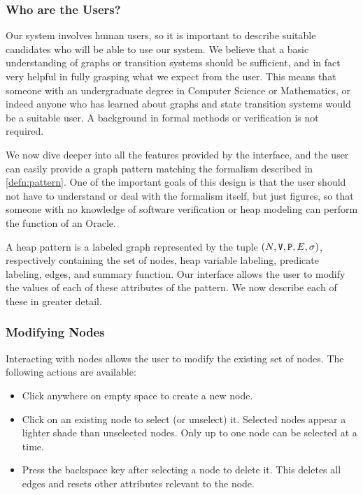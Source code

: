 \subsubsection{Who are the Users?}
Our system involves human users, so it is important to describe suitable candidates who will be able to use our system. We believe that a basic understanding of graphs or transition systems should be sufficient, and in fact very helpful in fully grasping what we expect from the user. This means that someone with an undergraduate degree in Computer Science or Mathematics, or indeed anyone who has learned about graphs and state transition systems would be a suitable user. A background in formal methods or verification is not required.

We now dive deeper into all the features provided by the interface, and the user can easily provide a graph pattern matching the formalism described in \autoref{defn:pattern}. One of the important goals of this design is that the user should not have to understand or deal with the formalism itself, but just figures, so that someone with no knowledge of software verification or heap modeling can perform the function of an Oracle.

A heap pattern is a labeled graph represented by the tuple $(N, \mathtt{V}, \mathtt{P}, E, \sigma)$, respectively containing the set of nodes, heap variable labeling, predicate labeling, edges, and summary function. Our interface allows the user to modify the values of each of these attributes of the pattern. We now describe each of these in greater detail.

\subsubsection{Modifying Nodes}
Interacting with nodes allows the user to modify the existing set of nodes. The following actions are available:
\begin{itemize}
  \item Click anywhere on empty space to create a new node.
  \item Click on an existing node to select (or unselect) it. Selected nodes appear a lighter shade than unselected nodes. Only up to one node can be selected at a time.
  \item Press the backspace key after selecting a node to delete it. This deletes all edges and resets other attributes relevant to the node.
\end{itemize}

